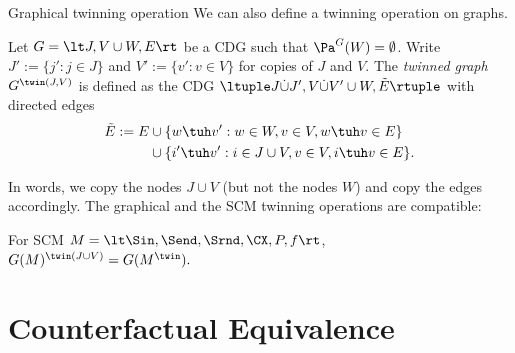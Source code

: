 \begin{frame}{Graphical twinning operation}
We can also define a twinning operation on graphs.
\begin{Def}\label{def:G_twinning}
  Let $G=\lt J,V \cup W,E\rt$ be a CDG such that $\Pa^G(W) = \emptyset$. Write $J' := \{j' : j \in J\}$
  and $V' := \{v' : v \in V\}$ for copies of $J$ and $V$.
  The \emph{twinned graph
  $G^{\twin(J,V)}$} is defined as the CDG $\ltuple J \dot\cup J', V \dot\cup V' \cup W, \tilde{E}\rtuple$ with directed edges
  \begin{equation*}\begin{split}
    \tilde{E} := E & \cup \{w \tuh v' : w \in W, v \in V, w \tuh v \in E\}\\
                   & \cup \{i' \tuh v' : i \in J \cup V, v \in V, i \tuh v \in E\}.
  \end{split}\end{equation*}
\end{Def}
In words, we copy the nodes $J \cup V$ (but not the nodes $W$) and copy the edges accordingly.
The graphical and the SCM twinning operations are compatible:
\begin{Prp}\label{prp:compatibility_graph_twinning}
  For SCM $M = \lt \Sin, \Send, \Srnd, \CX, P, f \rt$, $G(M)^{\twin(J\cup V)} = G(M^\twin).$
\end{Prp}
\end{frame}

\part{Counterfactual Equivalence}
\frame{\partpage}


